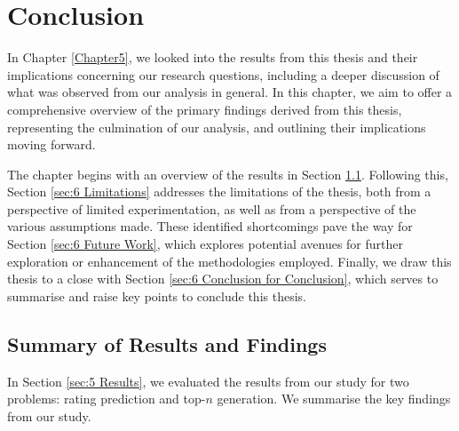 
\chapter{Conclusion} %
\label{Chapter6} %

In Chapter \ref{Chapter5}, we looked into the results from this thesis and their implications concerning our research questions, including a deeper discussion of what was observed from our analysis in general. In this chapter, we aim to offer a comprehensive overview of the primary findings derived from this thesis, representing the culmination of our analysis, and outlining their implications moving forward.

The chapter begins with an overview of the results in Section \ref{sec:6 Summary of Results and Findings}. Following this, Section \ref{sec:6 Limitations} addresses the limitations of the thesis, both from a perspective of limited experimentation, as well as from a perspective of the various assumptions made. These identified shortcomings pave the way for Section \ref{sec:6 Future Work}, which explores potential avenues for further exploration or enhancement of the methodologies employed. Finally, we draw this thesis to a close with Section \ref{sec:6 Conclusion for Conclusion}, which serves to summarise and raise key points to conclude this thesis. 


\section{Summary of Results and Findings}
\label{sec:6 Summary of Results and Findings}


In Section \ref{sec:5 Results}, we evaluated the results from our study for two problems: rating prediction and top-$n$ generation. We summarise the key findings from our study. 




